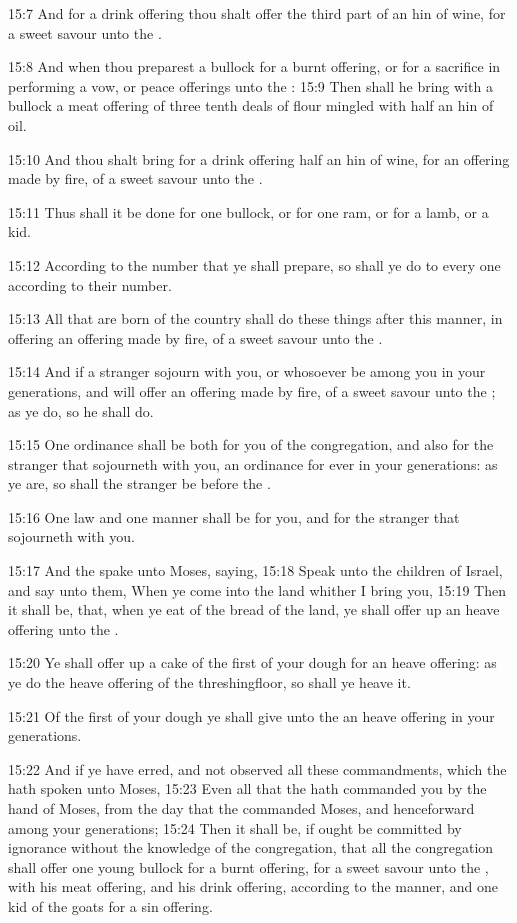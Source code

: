 15:7 And for a drink offering thou shalt offer the third part of an
hin of wine, for a sweet savour unto the \LORD.

15:8 And when thou preparest a bullock for a burnt offering, or for a
sacrifice in performing a vow, or peace offerings unto the \LORD: 15:9
Then shall he bring with a bullock a meat offering of three tenth
deals of flour mingled with half an hin of oil.

15:10 And thou shalt bring for a drink offering half an hin of wine,
for an offering made by fire, of a sweet savour unto the \LORD.

15:11 Thus shall it be done for one bullock, or for one ram, or for a
lamb, or a kid.

15:12 According to the number that ye shall prepare, so shall ye do to
every one according to their number.

15:13 All that are born of the country shall do these things after
this manner, in offering an offering made by fire, of a sweet savour
unto the \LORD.

15:14 And if a stranger sojourn with you, or whosoever be among you in
your generations, and will offer an offering made by fire, of a sweet
savour unto the \LORD; as ye do, so he shall do.

15:15 One ordinance shall be both for you of the congregation, and
also for the stranger that sojourneth with you, an ordinance for ever
in your generations: as ye are, so shall the stranger be before the
\LORD.

15:16 One law and one manner shall be for you, and for the stranger
that sojourneth with you.

15:17 And the \LORD spake unto Moses, saying, 15:18 Speak unto the
children of Israel, and say unto them, When ye come into the land
whither I bring you, 15:19 Then it shall be, that, when ye eat of the
bread of the land, ye shall offer up an heave offering unto the \LORD.

15:20 Ye shall offer up a cake of the first of your dough for an heave
offering: as ye do the heave offering of the threshingfloor, so shall
ye heave it.

15:21 Of the first of your dough ye shall give unto the \LORD an heave
offering in your generations.

15:22 And if ye have erred, and not observed all these commandments,
which the \LORD hath spoken unto Moses, 15:23 Even all that the \LORD
hath commanded you by the hand of Moses, from the day that the \LORD
commanded Moses, and henceforward among your generations; 15:24 Then
it shall be, if ought be committed by ignorance without the knowledge
of the congregation, that all the congregation shall offer one young
bullock for a burnt offering, for a sweet savour unto the \LORD, with
his meat offering, and his drink offering, according to the manner,
and one kid of the goats for a sin offering.

